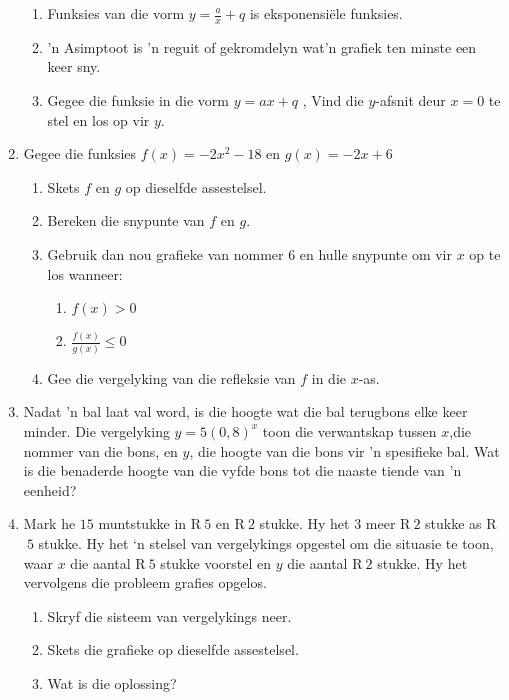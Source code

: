 \begin{eocexercises}{}
\begin{enumerate}[noitemsep, label=\textbf{\arabic*}. ]
\begin{enumerate}[noitemsep, label=\textbf{(\alph*)} ]
    \item Funksies van die vorm $y=\frac{a}{x}+q$ is eksponensiële funksies.
    \item 'n Asimptoot is 'n reguit of gekromdelyn wat'n grafiek ten minste een keer sny. 
    \item Gegee die funksie in die vorm $y=ax+q$ , Vind die $y$-afsnit deur $x=0$ te stel en los op vir $y$.
    \end{enumerate}
\item Gegee die funksies $f(x)=-2{x}^{2}-18$ en $g(x)=-2x+6$
    \begin{enumerate}[noitemsep, label=\textbf{(\alph*)} ]
    \item Skets $f$ en $g$ op dieselfde assestelsel.
    \item Bereken die snypunte van $f$ en $g$.
    \item Gebruik dan nou grafieke van nommer $6$ en hulle snypunte om vir $x$ op te los wanneer:
	\begin{enumerate}[noitemsep, label=\textbf{\roman*}. ] 
	\item $f(x)>0$
	\item $\frac{f(x)}{g(x)}\leq 0$
	\end{enumerate}
    \item Gee die vergelyking van die refleksie van $f$ in die $x$-as.
    \end{enumerate}
\item Nadat ’n bal laat val word, is die hoogte wat die bal terugbons elke keer minder. Die vergelyking $y=5{(0,8)}^{x}$ toon die verwantskap tussen
 $x$,die nommer van die bons, en $y$, die hoogte van die bons vir ’n
spesifieke bal. Wat is die benaderde hoogte van die vyfde bons tot die naaste tiende van ’n eenheid?\newline
\item Mark he $15$ muntstukke in R$~5$ en R$~2$ stukke. Hy het $3$ meer R$~2$ stukke as R$~5$ stukke. Hy het ‘n stelsel
van vergelykings opgestel om die situasie te toon, waar $x$  die aantal R$~5$ stukke voorstel en $y$ die
aantal R$~2$ stukke. Hy het vervolgens die probleem grafies opgelos.
    \begin{enumerate}[noitemsep, label=\textbf{(\alph*)} ]
    \item Skryf die sisteem van vergelykings neer.
    \item Skets die grafieke op dieselfde assestelsel.
    \item Wat is die oplossing?
    \end{enumerate}

\end{enumerate}
\end{eocexercises}
